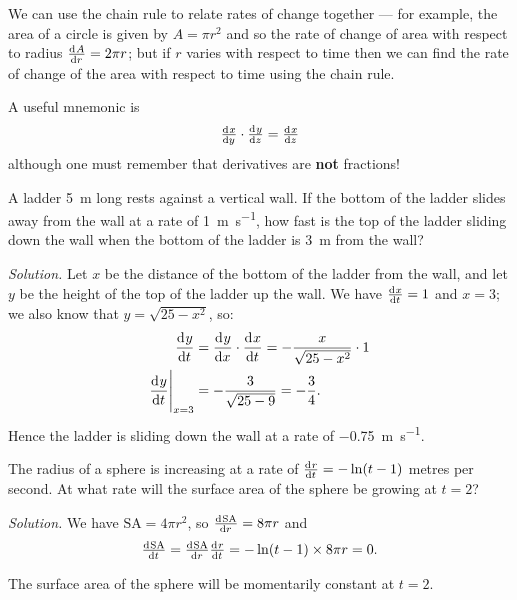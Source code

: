 


We can use the chain rule to relate rates of change together --- for example, the area of a circle is given by $ A = \pi r^2 $
and so the rate of change of area with respect to radius $ \od{A}{r} = 2\pi r $; but if $ r $ varies with respect to time then
we can find the rate of change of the area with respect to time using the chain rule.

A useful mnemonic is
\begin{displaymath}
  \od{x}{y} \cdot \od{y}{z} = \od{x}{z}
\end{displaymath}
although one must remember that derivatives are \textbf{not} fractions!

\begin{ex}
  A ladder \SI{5}{\metre} long rests against a vertical wall. If the bottom of the ladder slides away
  from the wall at a rate of \SI{1}{\metre\per\second}, how fast is the top of the ladder sliding down the
  wall when the bottom of the ladder is \SI{3}{\metre} from the wall?

  \textit{Solution.} Let $ x $ be the distance of the bottom of the ladder from the wall, and let $ y $
  be the height of the top of the ladder up the wall. We have $ \od{x}{t} = 1 $ and $ x = 3 $; we also
  know that $ y = \sqrt{25 - x^2} $, so:
  \begin{align*}
    \dod{y}{t} &= \dod{y}{x} \cdot \dod{x}{t} = -\frac{x}{\sqrt{25 - x^2}} \cdot 1\\
    \eval{\dod{y}{t}}_{x = 3} &= -\frac{3}{\sqrt{25 - 9}} = -\frac{3}{4}.
  \end{align*}
  Hence the ladder is sliding down the wall at a rate of \SI{-0.75}{\metre\per\second}.
\end{ex}

\begin{ex}
  The radius of a sphere is increasing at a rate of $ \od{r}{t} = -\ln(t - 1) $ metres per second. At what rate will the surface area of
  the sphere be growing at $ t = 2 $?

  \textit{Solution.} We have $ \mathrm{SA} = 4\pi r^2 $, so $ \od{\mathrm{SA}}{r} = 8\pi r $ and
    \begin{displaymath}
      \od{\mathrm{SA}}{t} = \od{\mathrm{SA}}{r} \od{r}{t} = -\ln(t - 1) \times 8\pi r = 0.
    \end{displaymath}

    The surface area of the sphere will be momentarily constant at $ t = 2 $.
\end{ex}

